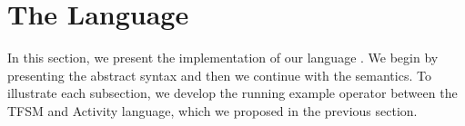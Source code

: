 \section{The Language}
In this section, we present the implementation of our language \bcool. We begin by presenting the abstract syntax and then we continue with the semantics. To illustrate each subsection, we develop the running example operator between the TFSM and Activity language, which we proposed in the previous section.  





